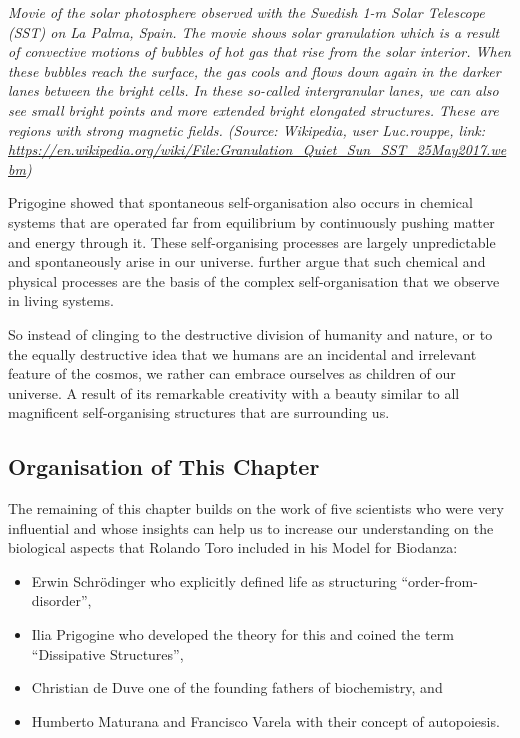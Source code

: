 \documentclass[
  11pt,
]{book}
\providecommand{\tightlist}{%
  \setlength{\itemsep}{0pt}\setlength{\parskip}{0pt}}
\begin{document}
\emph{Movie of the solar photosphere observed with the Swedish 1-m Solar Telescope (SST) on La Palma, Spain. The movie shows solar granulation which is a result of convective motions of bubbles of hot gas that rise from the solar interior. When these bubbles reach the surface, the gas cools and flows down again in the darker lanes between the bright cells. In these so-called intergranular lanes, we can also see small bright points and more extended bright elongated structures. These are regions with strong magnetic fields. (Source: Wikipedia, user Luc.rouppe, link: \url{https://en.wikipedia.org/wiki/File:Granulation_Quiet_Sun_SST_25May2017.webm})}

Prigogine showed that spontaneous self-organisation also occurs in chemical systems that are operated far from equilibrium by continuously pushing matter and energy through it. These self-organising processes are largely unpredictable and spontaneously arise in our universe.
\citet{prigogineStengers1984} further argue that such chemical and physical processes are the basis of the complex self-organisation that we observe in living systems.

So instead of clinging to the destructive division of humanity and nature, or to the equally destructive idea that we humans are an incidental and irrelevant feature of the cosmos, we rather can embrace ourselves as children of our universe. A result of its remarkable creativity with a beauty similar to all magnificent self-organising structures that are surrounding us.

\hypertarget{organisation-of-this-chapter}{%
\subsection{Organisation of This Chapter}\label{organisation-of-this-chapter}}

The remaining of this chapter builds on the work of five scientists who were very influential and whose insights can help us to increase our understanding on the biological aspects that Rolando Toro included in his Model for Biodanza:

\begin{itemize}
\tightlist
\item
  Erwin Schrödinger who explicitly defined life as structuring ``order-from-disorder'',
\item
  Ilia Prigogine who developed the theory for this and coined the term ``Dissipative Structures'',
\item
  Christian de Duve one of the founding fathers of biochemistry, and
\item
  Humberto Maturana and Francisco Varela with their concept of autopoiesis.
\end{itemize}
\end{document}
